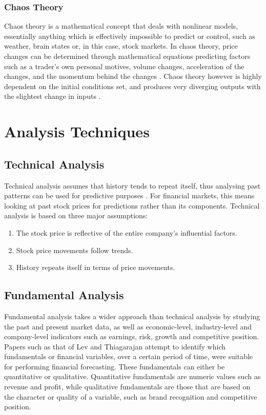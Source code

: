 \documentclass{UoYCSproject}
\begin{document}
\subsubsection{Chaos Theory}
Chaos theory is a mathematical concept that deals with nonlinear models, essentially anything which is effectively impossible to predict or control, such as weather, brain states or, in this case, stock markets. In chaos theory, price changes can be determined through mathematical equations predicting factors such as a trader's own personal motives, volume changes, acceleration of the changes, and the momentum behind the changes \cite{chaostheory}. Chaos theory however is highly dependent on the initial conditions set, and produces very diverging outputs with the slightest change in inputs \cite{kellert1993wake}. 

\section{Analysis Techniques}
\subsection{Technical Analysis}
Technical analysis assumes that history tends to repeat itself, thus analysing past patterns can be used for predictive purposes \cite{levy1966conceptual}. For financial markets, this means looking at past stock prices for predictions rather than its components. Technical analysis is based on three major assumptions:
\begin{enumerate}
    \item The stock price is reflective of the entire company's influential factors.
    \item Stock price movements follow trends.
    \item History repeats itself in terms of price movements.
\end{enumerate}

\subsection{Fundamental Analysis}
Fundamental analysis takes a wider approach than technical analysis by studying the past and present market data, as well as economic-level, industry-level and company-level indicators such as earnings, risk, growth and competitive position. Papers such as that of Lev and Thiagarajan \cite{lev1993fundamental} attempt to identify which fundamentals or financial variables, over a certain period of time, were suitable for performing financial forecasting. These fundamentals can either be quantitative or qualitative. Quantitative fundamentals are numeric values such as revenue and profit, while qualitative fundamentals are those that are based on the character or quality of a variable, such as brand recognition and competitive position. 
\end{document}
